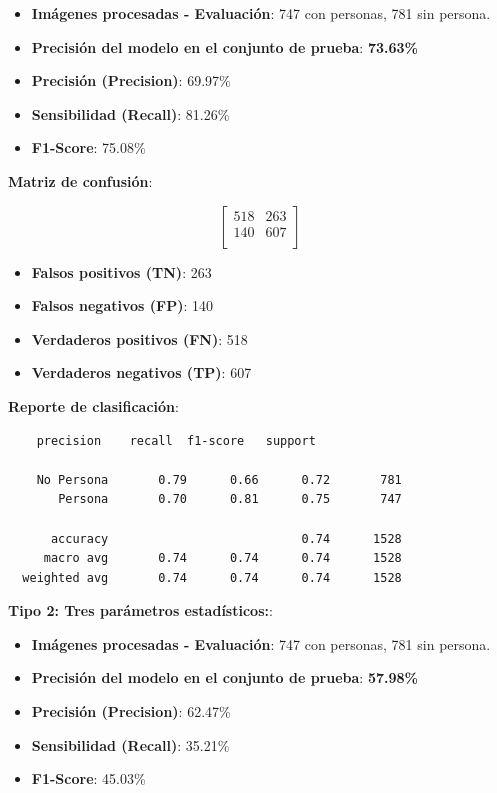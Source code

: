 \documentclass[a4paper]{article}
\begin{document}
\begin{itemize}
    \item \textbf{Imágenes procesadas - Evaluación}: 747 con personas, 781 sin persona.
    \item \textbf{Precisión del modelo en el conjunto de prueba}: \textbf{73.63\%}
    \item \textbf{Precisión (Precision)}: 69.97\%
    \item \textbf{Sensibilidad (Recall)}: 81.26\%
    \item \textbf{F1-Score}: 75.08\%
\end{itemize}

\textbf{Matriz de confusión}:

\[
\begin{bmatrix}
    518 & 263 \\
    140 & 607 \\
\end{bmatrix}
\]

\begin{itemize}
    \item \textbf{Falsos positivos (TN)}: 263
    \item \textbf{Falsos negativos (FP)}: 140
    \item \textbf{Verdaderos positivos (FN)}: 518
    \item \textbf{Verdaderos negativos (TP)}: 607
\end{itemize}

\textbf{Reporte de clasificación}:

\begin{verbatim}
    precision    recall  f1-score   support

    No Persona       0.79      0.66      0.72       781
       Persona       0.70      0.81      0.75       747
  
      accuracy                           0.74      1528
     macro avg       0.74      0.74      0.74      1528
  weighted avg       0.74      0.74      0.74      1528
\end{verbatim}

\vspace{0.5cm}
\textbf{Tipo 2: Tres parámetros estadísticos:}:

\begin{itemize}
    \item \textbf{Imágenes procesadas - Evaluación}: 747 con personas, 781 sin persona.
    \item \textbf{Precisión del modelo en el conjunto de prueba}: \textbf{57.98\%}
    \item \textbf{Precisión (Precision)}: 62.47\%
    \item \textbf{Sensibilidad (Recall)}: 35.21\%
    \item \textbf{F1-Score}: 45.03\%
\end{itemize}
\end{document}
